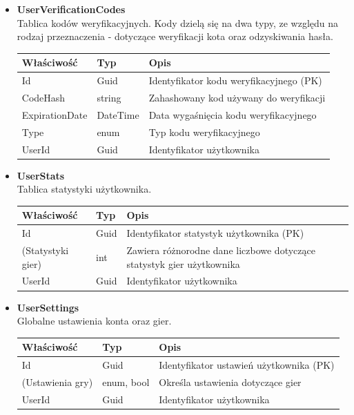 \documentclass[twoside]{projektInzynierskiMS1}
\begin{document}
\begin{itemize}
\newpage

    \item \textbf{UserVerificationCodes}\\
    Tablica kodów weryfikacyjnych. Kody dzielą się na dwa typy, ze względu na rodzaj przeznaczenia - dotyczące weryfikacji kota oraz odzyskiwania hasła.
    \renewcommand{\arraystretch}{1.2}
    \begin{longtable}{|m{4cm}|m{2cm}|m{8cm}|}
        \hline
        \rowcolor{lightgray}
        \textbf{Właściwość} & \textbf{Typ} & \textbf{Opis} \\ \hline
        \endhead
        \hline
        Id & Guid & Identyfikator kodu weryfikacyjnego (PK) \\ \hline
        CodeHash & string & Zahashowany kod używany do weryfikacji \\ \hline
        ExpirationDate & DateTime & Data wygaśnięcia kodu weryfikacyjnego \\ \hline
        Type & enum & Typ kodu weryfikacyjnego \\ \hline
        UserId & Guid & Identyfikator użytkownika \\ \hline
    \end{longtable}

    \item \textbf{UserStats}\\
    Tablica statystyki użytkownika.
    \renewcommand{\arraystretch}{1.2}
    \begin{longtable}{|m{4cm}|m{2cm}|m{8cm}|}
        \hline
        \rowcolor{lightgray}
        \textbf{Właściwość} & \textbf{Typ} & \textbf{Opis} \\ \hline
        \endhead
        \hline
        Id & Guid & Identyfikator statystyk użytkownika (PK) \\ \hline
        (Statystyki gier) & int & Zawiera różnorodne dane liczbowe dotyczące statystyk gier użytkownika \\ \hline
        UserId & Guid & Identyfikator użytkownika \\ \hline
    \end{longtable}

    \item \textbf{UserSettings}\\
    Globalne ustawienia konta oraz gier.
    \renewcommand{\arraystretch}{1.2}
    \begin{longtable}{|m{4cm}|m{2cm}|m{8cm}|}
        \hline
        \rowcolor{lightgray}
        \textbf{Właściwość} & \textbf{Typ} & \textbf{Opis} \\ \hline
        \endhead
        \hline
        Id & Guid & Identyfikator ustawień użytkownika (PK) \\ \hline
        (Ustawienia gry) & enum, bool & Określa ustawienia dotyczące gier \\ \hline
        UserId & Guid & Identyfikator użytkownika \\ \hline
    \end{longtable}


\end{itemize}
\end{document}
